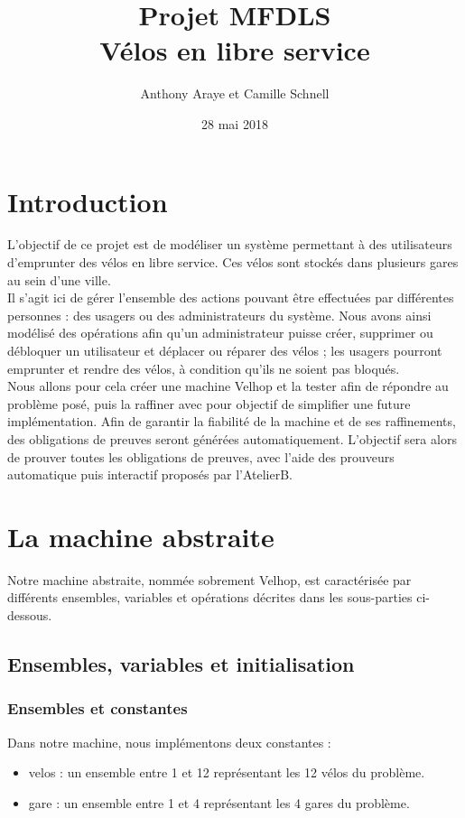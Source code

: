 \documentclass[12pt]{article}
\title{Projet MFDLS \\ Vélos en libre service}
\author{Anthony Araye et Camille Schnell}
\date{28 mai 2018}
\begin{document}
\maketitle
\newpage
\renewcommand{\contentsname}{Sommaire}
\tableofcontents
\newpage
\section{Introduction}
L'objectif de ce projet est de modéliser un système permettant à des utilisateurs d'emprunter des vélos en libre service. Ces vélos sont stockés dans plusieurs gares au sein d'une ville. \\

Il s'agit ici de gérer l'ensemble des actions pouvant être effectuées par différentes personnes : des usagers ou des administrateurs du système. Nous avons ainsi modélisé des opérations afin qu'un administrateur puisse créer, supprimer ou débloquer un utilisateur et déplacer ou réparer des vélos ; les usagers pourront emprunter et rendre des vélos, à condition qu'ils ne soient pas bloqués. \\

Nous allons pour cela créer une machine Velhop et la tester afin de répondre au problème posé, puis la raffiner avec pour objectif de simplifier une future implémentation. Afin de garantir la fiabilité de la machine et de ses raffinements, des obligations de preuves seront générées automatiquement. L'objectif sera alors de prouver toutes les obligations de preuves, avec l'aide des prouveurs automatique puis interactif proposés par l'AtelierB.\\
\newpage
\section{La machine abstraite}
Notre machine abstraite, nommée sobrement Velhop, est caractérisée par différents ensembles, variables et opérations décrites dans les sous-parties ci-dessous.
\subsection{Ensembles, variables et initialisation}
\subsubsection{Ensembles et constantes}
Dans notre machine, nous implémentons deux constantes :
\begin{itemize}
  \item velos : un ensemble entre 1 et 12 représentant les 12 vélos du problème.
  \item gare : un ensemble entre 1 et 4 représentant les 4 gares du problème.
\end{itemize}
\end{document}
